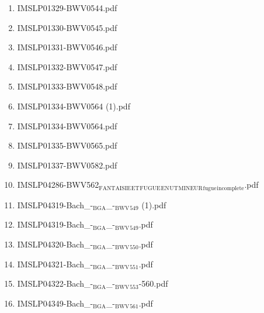 \documentclass[11pt]{article}
\begin{document}
\begin{enumerate}
\begin{enumerate}
\begin{enumerate}
\begin{enumerate}
\item IMSLP01329-BWV0544.pdf
\label{sec-1-1-1-1-44-6-4-1-4-17}

\item IMSLP01330-BWV0545.pdf
\label{sec-1-1-1-1-44-6-4-1-4-18}

\item IMSLP01331-BWV0546.pdf
\label{sec-1-1-1-1-44-6-4-1-4-19}

\item IMSLP01332-BWV0547.pdf
\label{sec-1-1-1-1-44-6-4-1-4-20}

\item IMSLP01333-BWV0548.pdf
\label{sec-1-1-1-1-44-6-4-1-4-21}

\item IMSLP01334-BWV0564 (1).pdf
\label{sec-1-1-1-1-44-6-4-1-4-22}

\item IMSLP01334-BWV0564.pdf
\label{sec-1-1-1-1-44-6-4-1-4-23}

\item IMSLP01335-BWV0565.pdf
\label{sec-1-1-1-1-44-6-4-1-4-24}

\item IMSLP01337-BWV0582.pdf
\label{sec-1-1-1-1-44-6-4-1-4-25}

\item IMSLP04286-BWV562$_{\text{FANTAISIE}}$$_{\text{ET}}$$_{\text{FUGUE}}$$_{\text{EN}}$$_{\text{UT}}$$_{\text{MINEUR}}$$_{\text{fugue}}$$_{\text{incomplete}}$.pdf
\label{sec-1-1-1-1-44-6-4-1-4-26}

\item IMSLP04319-Bach\_-$_{\text{BGA}}$\_-$_{\text{BWV}}$$_{\text{549}}$ (1).pdf
\label{sec-1-1-1-1-44-6-4-1-4-27}

\item IMSLP04319-Bach\_-$_{\text{BGA}}$\_-$_{\text{BWV}}$$_{\text{549}}$.pdf
\label{sec-1-1-1-1-44-6-4-1-4-28}

\item IMSLP04320-Bach\_-$_{\text{BGA}}$\_-$_{\text{BWV}}$$_{\text{550}}$.pdf
\label{sec-1-1-1-1-44-6-4-1-4-29}

\item IMSLP04321-Bach\_-$_{\text{BGA}}$\_-$_{\text{BWV}}$$_{\text{551}}$.pdf
\label{sec-1-1-1-1-44-6-4-1-4-30}

\item IMSLP04322-Bach\_-$_{\text{BGA}}$\_-$_{\text{BWV}}$$_{\text{553}}$-560.pdf
\label{sec-1-1-1-1-44-6-4-1-4-31}

\item IMSLP04349-Bach\_-$_{\text{BGA}}$\_-$_{\text{BWV}}$$_{\text{561}}$.pdf
\label{sec-1-1-1-1-44-6-4-1-4-32}


\end{enumerate}
\end{enumerate}
\end{enumerate}
\end{enumerate}
\end{document}
